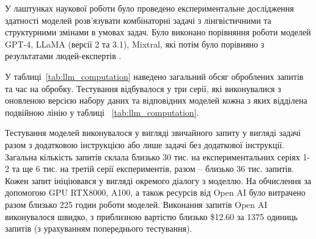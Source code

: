 У лаштунках наукової роботи було проведено експериментальне дослідження здатності моделей розв'язувати комбінаторні задачі з лінгвістичними та структурними змінами в умовах задач. Було виконано порівняння роботи моделей GPT-4, LLaMA (версії 2 та 3.1), Mixtral, які потім було порівняно з результатами людей-експертів \cite{nikolaiev2024can}.

У таблиці~\ref{tab:llm_computation} наведено загальний обсяг оброблених запитів та час на обробку. Тестування відбувалося у три серії, які виконувалися з оновленою версією набору даних та відповідних моделей кожна з яких відділена подвійною лінію у таблиці ~\ref{tab:llm_computation}.

Тестування моделей виконувалося у вигляді звичайного запиту у вигляді задачі разом з додатковою інструкцією або лише задачі без додаткової інструкції. Загальна кількість запитів склала близько 30 тис. на експериментальних серіях 1-2 та ще 6 тис. на третій серії експериментів, разом -- близько 36 тис. запитів. Кожен запит ініціювався у вигляді окремого діалогу з моделлю. На обчислення за допомогою GPU RTX8000, A100, а також ресурсів від Open AI було витрачено разом близько 225 годин роботи моделей. Виконання запитів Open AI виконувалося швидко, з приблизною вартістю близько \$12.60 за 1375 одиниць запитів (з урахуванням попереднього тестування).

